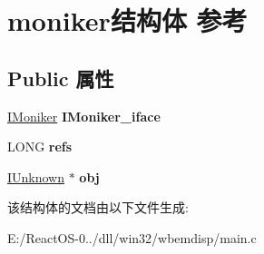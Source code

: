 \hypertarget{structmoniker}{}\section{moniker结构体 参考}
\label{structmoniker}
\subsection*{Public 属性}
\begin{DoxyCompactItemize}
\item 
\mbox{\label{structmoniker_a69755789f51df91c7396ed732776a75e}} 
\hyperlink{interface_i_moniker}{I\+Moniker} {\bfseries I\+Moniker\+\_\+iface}
\item 
\mbox{\label{structmoniker_a0101b5adcf1ca51a0528a6b2e69282a0}} 
L\+O\+NG {\bfseries refs}
\item 
\mbox{\label{structmoniker_aa9225cf1e75eac06604190a2fad16d71}} 
\hyperlink{interface_i_unknown}{I\+Unknown} $\ast$ {\bfseries obj}
\end{DoxyCompactItemize}


该结构体的文档由以下文件生成\+:\begin{DoxyCompactItemize}
\item 
E\+:/\+React\+O\+S-\/0../dll/win32/wbemdisp/main.\+c\end{DoxyCompactItemize}
